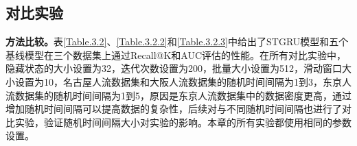 \documentclass[master]{thesis-uestc}
\begin{document}
\subsection{对比实验}
\label{对比实验设置}
\textbf{方法比较。}表\ref{Table.3.2}、\ref{Table.3.2.2}和\ref{Table.3.2.3}中给出了STGRU模型和五个基线模型在三个数据集上通过Recall@K和AUC评估的性能。在所有对比实验中，隐藏状态的大小设置为32，迭代次数设置为200，批量大小设置为512，滑动窗口大小设置为10，名古屋人流数据集和大阪人流数据集的随机时间间隔为1到3，东京人流数据集的随机时间间隔为1到5，原因是东京人流数据集中的数据密度更高，通过增加随机时间间隔可以提高数据的复杂性，后续对与不同随机时间间隔也进行了对比实验，验证随机时间间隔大小对实验的影响。本章的所有实验都使用相同的参数设置。
\begin{table}[!ht]
\centering
\caption{在NPF数据集上Recall@K和AUC指标的结果}%
\label{Table.3.2}
\end{table}
\\
\end{document}
